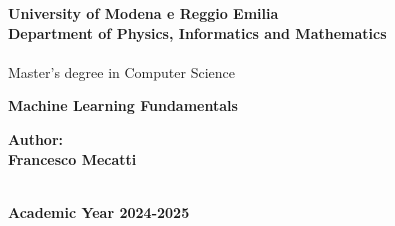 \documentclass[12pt,a4paper,twoside,onecolumn,openright]{book}
\begin{document}
\begin{sloppypar}

\begin{titlepage}
\begin{center} {
    \large
    \textbf{University of Modena e Reggio Emilia} \\
     \textbf{Department of Physics, Informatics and Mathematics} \\
    \hspace*{0cm} \hrulefill \hspace*{0cm} \\
    Master's degree in Computer Science
    
    \begin{spacing}{1}
        \huge{\bf Machine Learning Fundamentals}
    \end{spacing}
}
\vspace{3mm}
\end{center}

\vspace{40mm}
\par
\noindent
\hfill
\begin{minipage}[t]{0.47\textwidth}\raggedleft
{\large{\bf Author:\\ Francesco Mecatti}}
\end{minipage}
\vspace{10mm}

\begin{center}
\hspace*{0cm} \hrulefill \hspace*{0cm} \\
\vspace{5mm}
{\large{\bf Academic Year 2024-2025}}
\end{center}
\end{titlepage}

\setlength{\parindent}{0pt}
\setlength{\parskip}{1ex plus 0.5ex minus 0.2ex}
\frontmatter
\mainmatter

\newcommand{\whitepage}{\hbox{}\thispagestyle{empty}\newpage}

\renewcommand{\contentsname}{Table of Contents} \tableofcontents



\end{sloppypar}
\end{document}
